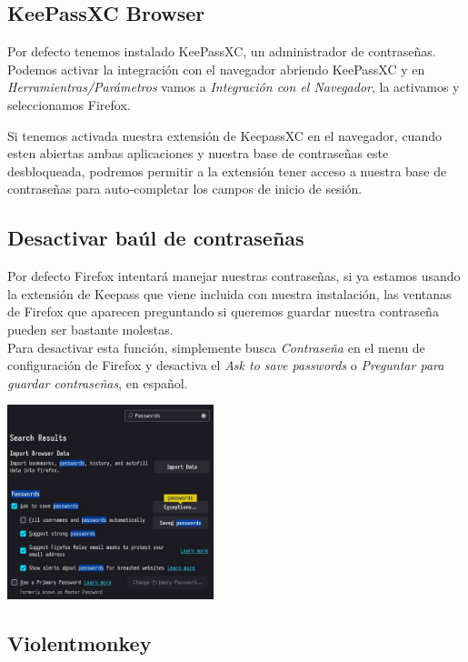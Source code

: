 \documentclass[12pt]{article}
\begin{document}
\subsection{KeePassXC Browser}

Por defecto tenemos instalado KeePassXC, un administrador de contraseñas. Podemos activar la integración con el navegador abriendo KeePassXC y en \emph{Herramientras/Parámetros} vamos a \emph{Integración con el Navegador}, la activamos y seleccionamos Firefox.

Si tenemos activada nuestra extensión de KeepassXC en el navegador, cuando esten abiertas ambas aplicaciones y nuestra base de contraseñas este desbloqueada, podremos permitir a la extensión tener acceso a nuestra base de contraseñas para auto-completar los campos de inicio de sesión.

\subsection{Desactivar baúl de contraseñas}

\begin{multicols}{2}
\begin{minipage}[t]{0.45\textwidth}
Por defecto Firefox intentará manejar nuestras contraseñas, si ya estamos usando la extensión de Keepass que viene incluida con nuestra instalación, las ventanas de Firefox que aparecen preguntando si queremos guardar nuestra contraseña pueden ser bastante molestas.
\vspace{10pt}\\
Para desactivar esta función, simplemente busca \emph{Contraseña} en el menu de configuración de Firefox y desactiva el \emph{Ask to save passwords} o \emph{Preguntar para guardar contraseñas}, en español.
\end{minipage}%
\hfill\includegraphics[width=0.45\textwidth]{images/passwords.jpg}
\end{multicols}

\subsection{Violentmonkey}
\end{document}

